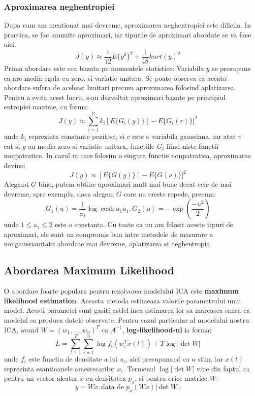 \documentclass[12pt,oneside]{article}
\begin{document}
\subsubsection{Aproximarea neghentropiei}
Dupa cum am mentionat mai devreme, aproximarea neghentropiei este dificila. In practica, se fac anumite aproximari, iar tipurile de aproximari abordate se va face aici. 
\begin{equation}
	J(y)\approx \frac{1}{12}E\{y^3\}^2 + \frac{1}{48}kurt(y)^2
\end{equation}
Prima abordare este cea bazata pe momentele statistice:
Variabila $y$ se presupune ca are media egala cu zero, si variatie unitara. Se poate observa ca aceata abordare sufera de aceleasi limitari precum aproximarea folosind aplatizarea. Pentru a evita acest lucru, s-au dezvoltat aproximari bazate pe principiul entropiei maxime, cu forma:
\begin{equation}
	J(y)\approx\sum_{i=1}^p k_i[E\{G_i(y)\}]-E\{G_i(v)\}]^2
\end{equation}
unde $k_i$ reprezinta constante pozitive, si $v$ este o variabila gaussiana, iar atat $v$ cat si $y$ au media zero si variatie unitara, functiile $G_i$ fiind niste functii nonpatratice. In cazul in care folosim o singura functie nonpatratica, aproximarea devine:
\begin{equation}
	J(y)\propto[E\{G(y)\}]-E\{G(v)\}]^2
\end{equation}
Alegand $G$ bine, putem obtine aproximari mult mai bune decat cele de mai devreme, spre exemplu, daca alegem $G$ care nu creste repede, precum:
\begin{equation}
	G_1(u)=\frac{1}{a_1}\log \cosh a_1 u_1, G_2(u)=-\exp(\frac{-u^2}{2})
\end{equation}
unde $1\leq a_1 \leq 2$ este o constanta. Cu toate ca nu am folosit aceste tipuri de aproximari, ele sunt un compromis bun intre metodele de masurare a nongaussianitatii abordate mai devreme, aplatizarea si neghentropia. 

\subsection{Abordarea Maximum Likelihood}
O abordare foarte populara pentru rezolvarea modelului ICA este \textbf{maximum likelihood estimation}. Aceasta metoda estimeaza valorile parametrului unui model.\cite{probability_concepts} Acesti parametri sunt gasiti astfel inca estimarea lor sa mareasca sansa ca modelul sa produca datele observate. Pentru cazul particular al modelului nostru ICA, avand $W=(w_1, \dots, w_n)^T$ ca $A^{-1}$, \textbf{log-likelihood-ul} ia forma:
\begin{equation}
	L=\sum_{t=1}^T \sum_{i=1}^n \log f_i(w_i^Tx(t)) + T \log |\det W|
\end{equation}
unde $f_i$ este functia de densitate a lui $s_i$, aici presupunand ca o stim, iar $x(t)$ reprezinta esantioanele amestecarilor $x_i$. Termenul $\log | \det W|$ vine din faptul ca pentru un vector aleator $x$ cu densitatea $p_x$, si pentru orice matrice $W$:
\begin{equation}
	y=Wx, \text{data de } p_x(Wx)|\det W|.
\end{equation}
\end{document}
